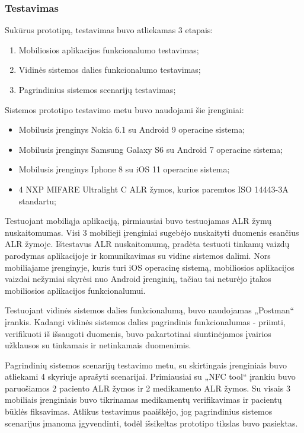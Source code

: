 \subsubsection{Testavimas}

Sukūrus prototipą, testavimas buvo atliekamas 3 etapais:
\begin{enumerate}
    \item Mobiliosios aplikacijos funkcionalumo testavimas;
    \item Vidinės sistemos dalies funkcionalumo testavimas;
    \item Pagrindinius sistemos scenarijų testavimas;
\end{enumerate}

Sistemos prototipo testavimo metu buvo naudojami šie įrenginiai:
\begin{itemize}
    \item Mobilusis įrenginys Nokia 6.1 su Android 9 operacine sistema;
    \item Mobilusis įrenginys Samsung Galaxy S6 su Android 7 operacine sistema;
    \item Mobilusis įrenginys Iphone 8 su iOS 11 operacine sistema;
    \item 4 NXP MIFARE Ultralight C ALR žymos, kurios paremtos ISO 14443-3A standartu;
\end{itemize}

Testuojant mobiliąja aplikaciją, pirmiausiai buvo testuojamas ALR žymų nuskaitomumas. Visi 3 mobilieji įrenginiai sugebėjo nuskaityti duomenis esančius ALR žymoje. Ištestavus ALR nuskaitomumą, pradėta testuoti tinkamų vaizdų parodymas aplikacijoje ir komunikavimas su vidine sistemos dalimi. Nors mobiliajame įrenginyje, kuris turi iOS operacinę sistemą, mobiliosios aplikacijos vaizdai nežymiai skyrėsi nuo Android įrenginių, tačiau tai neturėjo įtakos mobiliosios aplikacijos funkcionalumui.

Testuojant vidinės sistemos dalies funkcionalumą, buvo naudojamas „Postman“ įrankis. Kadangi vidinės sistemos dalies pagrindinis funkcionalumas - priimti, verifikuoti iš išsaugoti duomenis, buvo pakartotinai siuntinėjamos įvairios užklausos su tinkamais ir netinkamais duomenimis.

Pagrindinių sistemos scenarijų testavimo metu, su skirtingais įrenginiais buvo atliekami 4 skyriuje aprašyti scenarijai. Primiausiai su „NFC tool“ įrankiu buvo paruošiamos 2 paciento ALR žymos ir 2 medikamento ALR žymos. Su visais 3 mobiliais įrenginiais buvo tikrinamas medikamentų verifikavimas ir pacientų būklės fiksavimas. Atlikus testavimus paaiškėjo, jog pagrindinius sistemos scenarijus įmanoma įgyvendinti, todėl išsikeltas prototipo tikslas buvo pasiektas.